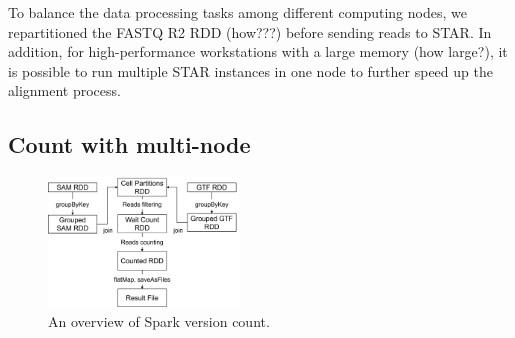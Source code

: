 \documentclass[conference]{IEEEtran}
\begin{document}

To balance the data processing tasks among different computing nodes, we repartitioned the FASTQ R2 RDD (how???) before sending reads to STAR. 
In addition, for high-performance workstations with a large memory (how large?), it is possible to run multiple STAR instances in one node to further speed up the alignment process. 

\subsection{Count with multi-node}
\begin{figure}
\centering
	\includegraphics[width=0.45\textwidth]{figure3.png}
	\caption{An overview of Spark version count.} \label{fig3}
\end{figure}
\end{document}

